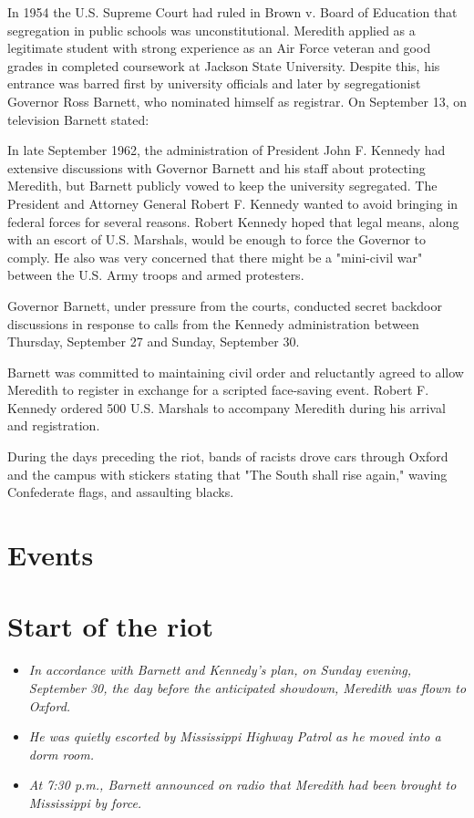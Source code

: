In 1954 the U.S. Supreme Court had ruled in Brown v. Board of Education
that segregation in public schools was unconstitutional. Meredith
applied as a legitimate student with strong experience as an Air Force
veteran and good grades in completed coursework at Jackson State
University. Despite this, his entrance was barred first by university
officials and later by segregationist Governor Ross Barnett, who
nominated himself as registrar. On September 13, on television Barnett
stated:

In late September 1962, the administration of President John F. Kennedy
had extensive discussions with Governor Barnett and his staff about
protecting Meredith, but Barnett publicly vowed to keep the university
segregated. The President and Attorney General Robert F. Kennedy wanted
to avoid bringing in federal forces for several reasons. Robert Kennedy
hoped that legal means, along with an escort of U.S. Marshals, would be
enough to force the Governor to comply. He also was very concerned that
there might be a "mini-civil war" between the U.S. Army troops and armed
protesters.

Governor Barnett, under pressure from the courts, conducted secret
backdoor discussions in response to calls from the Kennedy
administration between Thursday, September 27 and Sunday, September 30.

Barnett was committed to maintaining civil order and reluctantly agreed
to allow Meredith to register in exchange for a scripted face-saving
event. Robert F. Kennedy ordered 500 U.S. Marshals to accompany Meredith
during his arrival and registration.

During the days preceding the riot, bands of racists drove cars through
Oxford and the campus with stickers stating that "The South shall rise
again," waving Confederate flags, and assaulting blacks.

\section{Events}\label{events}

\section{Start of the riot}\label{start-of-the-riot}

\begin{itemize}
\item
  \emph{In accordance with Barnett and Kennedy's plan, on Sunday
  evening, September 30, the day before the anticipated showdown,
  Meredith was flown to Oxford.}
\item
  \emph{He was quietly escorted by Mississippi Highway Patrol as he
  moved into a dorm room.}
\item
  \emph{At 7:30 p.m., Barnett announced on radio that Meredith had been
  brought to Mississippi by force.}
\end{itemize}

